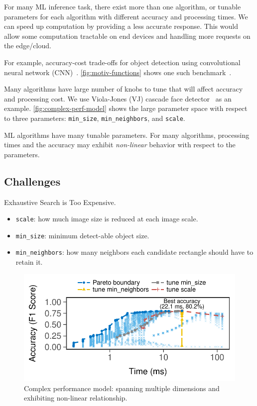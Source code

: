 For many ML inference task, there exist more than one algorithm, or tunable
parameters for each algorithm with different accuracy and processing times.  We
can speed up computation by providing a less accurate response. This would allow
some computation tractable on end devices and handling more requests on the
edge/cloud.

For example, accuracy-cost trade-offs for object detection using convolutional
neural network (CNN)~\cite{huang2016speed}. \autoref{fig:motiv-functions} shows
one such benchmark~\cite{cnn.benchmarks}.

Many algorithms have large number of knobs to tune that will affect accuracy and
processing cost. We use Viola-Jones (VJ) cascade face
detector~\cite{viola2001rapid} as an example. \autoref{fig:complex-perf-model}
shows the large parameter space with respect to three parameters:
\texttt{min\_size}, \texttt{min\_neighbors}, and \texttt{scale}.

ML algorithms have many tunable parameters. For many algorithms, processing
times and the accuracy may exhibit \textit{non-linear} behavior with respect to
the parameters.

\subsection{Challenges}
\label{sec:challenges}

Exhaustive Search is Too Expensive.

\begin{itemize}
\item \texttt{scale}: how much image size is reduced at each image scale.
\item \texttt{min\_size}: minimum detect-able object size.
\item \texttt{min\_neighbors}: how many neighbors each candidate rectangle should
  have to retain it.
\end{itemize}

\begin{figure}[t]
  \centering
  \includegraphics[width=.9\columnwidth]{figures/exhaustive-face.pdf}
  \caption{Complex performance model: spanning multiple dimensions and
    exhibiting non-linear relationship.}
  \label{fig:motiv-params}
\end{figure}

